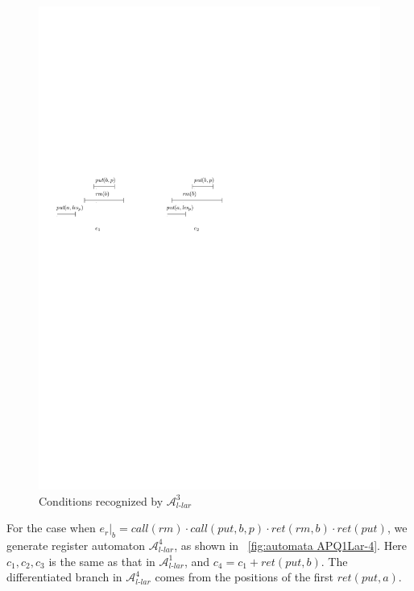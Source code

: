 \begin{figure}[htbp]
  \centering
  \includegraphics[width=0.7 \textwidth]{figures/PIC_HIS_PQ1Lar-rppr.pdf}
  \caption{Conditions recognized by $\mathcal{A}_{\textit{l-lar}}^3$}
  \label{fig:his for APQ1Lar-3}
\end{figure}


For the case when $e_r \vert_{b} = \textit{call}(\textit{rm}) \cdot \textit{call}(\textit{put},b,p) \cdot \textit{ret}(\textit{rm},b) \cdot \textit{ret}(\textit{put})$, we generate register automaton $\mathcal{A}_{\textit{l-lar}}^4$, as shown in \figurename~\ref{fig:automata APQ1Lar-4}. Here $c_1,c_2,c_3$ is the same as that in $\mathcal{A}_{\textit{l-lar}}^1$, and $c_4 = c_1 + \textit{ret}(\textit{put},b)$. The differentiated branch in $\mathcal{A}_{\textit{l-lar}}^4$ comes from the positions of the first $\textit{ret}(\textit{put},a)$.

